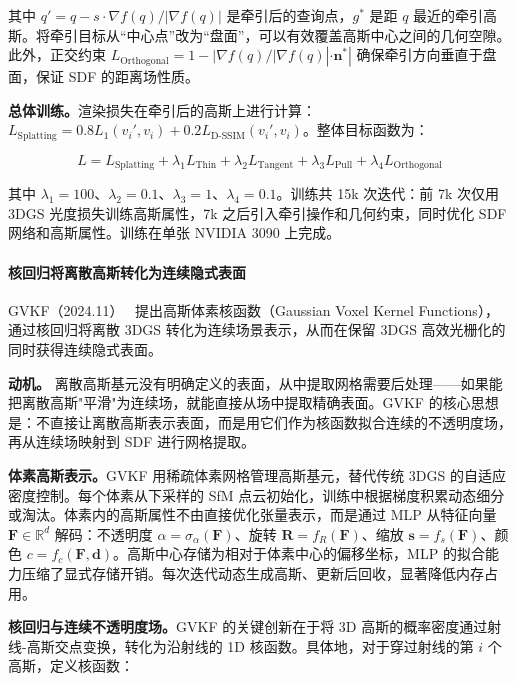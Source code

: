 其中 $q'=q - s \cdot \nabla f(q)/|\nabla f(q)|$ 是牵引后的查询点，$g^*$ 是距 $q$ 最近的牵引高斯。将牵引目标从“中心点”改为“盘面”，可以有效覆盖高斯中心之间的几何空隙。此外，正交约束 $L_\text{Orthogonal}=1-|\nabla f(q)/|\nabla f(q)| \cdot \mathbf{n}^*|$ 确保牵引方向垂直于盘面，保证 SDF 的距离场性质。

\textbf{总体训练。}渲染损失在牵引后的高斯上进行计算：$L_\text{Splatting}=0.8 L_1(v_i', v_i) + 0.2 L_\text{D-SSIM}(v_i', v_i)$。整体目标函数为：

\begin{equation}
L = L_\text{Splatting} + \lambda_1 L_\text{Thin} + \lambda_2 L_\text{Tangent} + \lambda_3 L_\text{Pull} + \lambda_4 L_\text{Orthogonal}
\end{equation}

其中 $\lambda_1=100$、$\lambda_2=0.1$、$\lambda_3=1$、$\lambda_4=0.1$。训练共 15k 次迭代：前 7k 次仅用 3DGS 光度损失训练高斯属性，7k 之后引入牵引操作和几何约束，同时优化 SDF 网络和高斯属性。训练在单张 NVIDIA 3090 上完成。

\paragraph{核回归将离散高斯转化为连续隐式表面}

GVKF（2024.11）~\cite{2411_01853} 提出高斯体素核函数（Gaussian Voxel Kernel Functions），通过核回归将离散 3DGS 转化为连续场景表示，从而在保留 3DGS 高效光栅化的同时获得连续隐式表面。

\textbf{动机。} 离散高斯基元没有明确定义的表面，从中提取网格需要后处理——如果能把离散高斯"平滑"为连续场，就能直接从场中提取精确表面。GVKF 的核心思想是：不直接让离散高斯表示表面，而是用它们作为核函数拟合连续的不透明度场，再从连续场映射到 SDF 进行网格提取。

\textbf{体素高斯表示。}GVKF 用稀疏体素网格管理高斯基元，替代传统 3DGS 的自适应密度控制。每个体素从下采样的 SfM 点云初始化，训练中根据梯度积累动态细分或淘汰。体素内的高斯属性不由直接优化张量表示，而是通过 MLP 从特征向量 $\mathbf{F} \in \mathbb{R}^d$ 解码：不透明度 $\alpha=\sigma_\alpha(\mathbf{F})$、旋转 $\mathbf{R}=f_R(\mathbf{F})$、缩放 $\mathbf{s}=f_s(\mathbf{F})$、颜色 $c=f_c(\mathbf{F}, \mathbf{d})$。高斯中心存储为相对于体素中心的偏移坐标，MLP 的拟合能力压缩了显式存储开销。每次迭代动态生成高斯、更新后回收，显著降低内存占用。

\textbf{核回归与连续不透明度场。}GVKF 的关键创新在于将 3D 高斯的概率密度通过射线-高斯交点变换，转化为沿射线的 1D 核函数。具体地，对于穿过射线的第 $i$ 个高斯，定义核函数：

